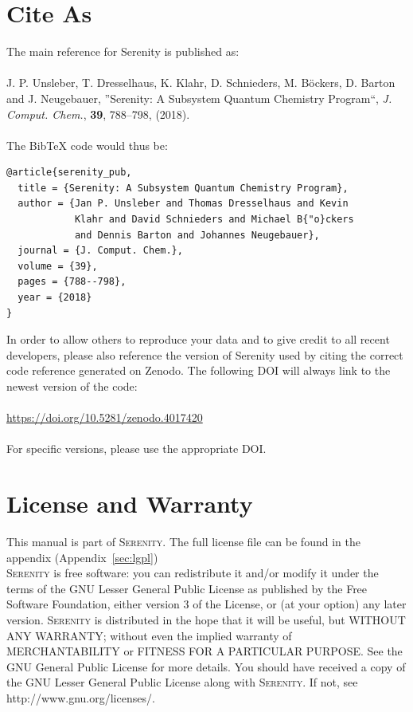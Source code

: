 \documentclass[bibliography=totocnumbered,a4paper,10pt,oneside]{scrbook}
\newcommand{
\serenity}{\textsc{Serenity}\xspace}
\begin{document}
\chapter{Cite As}
The main reference for Serenity is published as:\\
\\
J. P. Unsleber, T. Dresselhaus, K. Klahr, D. Schnieders, M. B{\"o}ckers, D. Barton and J. Neugebauer, ''Serenity: A Subsystem Quantum Chemistry Program``,
 \textit{J. Comput. Chem.}, \textbf{39}, 788--798, (2018).\\
\\
The BibTeX code would thus be:
\begin{lstlisting}
@article{serenity_pub,
  title = {Serenity: A Subsystem Quantum Chemistry Program},
  author = {Jan P. Unsleber and Thomas Dresselhaus and Kevin
            Klahr and David Schnieders and Michael B{"o}ckers
            and Dennis Barton and Johannes Neugebauer},
  journal = {J. Comput. Chem.},
  volume = {39},
  pages = {788--798},
  year = {2018}
}
\end{lstlisting}
In order to allow others to reproduce your data and to give credit to all recent developers,
please also reference the version of Serenity used by citing the correct code reference
generated on Zenodo. The following DOI will always link to the newest version of the code:\\
\\
\url{https://doi.org/10.5281/zenodo.4017420}\\
\\
For specific versions, please use the appropriate DOI.\\ 

\chapter{License and Warranty}
This manual is part of \serenity. The full license file can be found in the appendix (Appendix~\ref{sec:lgpl})\\

\serenity is free software: you can redistribute it and/or modify it under
the terms of the GNU Lesser General Public License as published by the Free
Software Foundation, either version 3 of the License, or (at your option) any later version.
\serenity is distributed in the hope that it will be useful, but
WITHOUT ANY WARRANTY; without even the implied warranty of MERCHANTABILITY
or FITNESS FOR A PARTICULAR PURPOSE. See the GNU General Public License for more details.
You should have received a copy of the GNU Lesser General Public License along with
\serenity. If not, see http://www.gnu.org/licenses/.
\end{document}
